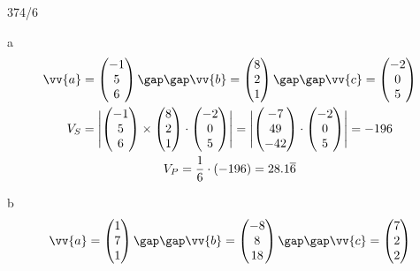 \begin{exercise}{374/6}
  \item [a]
  \begin{gather*}
    \vv{a} = \begin{pmatrix}-1 \\ 5 \\ 6\end{pmatrix} \gap\gap \vv{b} = \begin{pmatrix}8 \\ 2 \\ 1\end{pmatrix} \gap\gap \vv{c} = \begin{pmatrix}-2 \\ 0 \\ 5\end{pmatrix} \\
    V_S = \Biggl|\begin{pmatrix}-1 \\ 5 \\ 6\end{pmatrix} \times \begin{pmatrix}8 \\ 2 \\ 1\end{pmatrix} \cdot \begin{pmatrix}-2 \\ 0 \\ 5\end{pmatrix}\Biggr| = \Biggl|\begin{pmatrix}-7 \\ 49 \\ -42\end{pmatrix} \cdot \begin{pmatrix}-2 \\ 0 \\ 5\end{pmatrix}\Biggr| = -196 \\
    V_P = \frac{1}{6} \cdot (-196) = 28.1\overline{6}
  \end{gather*}
  \item [b]
  \begin{gather*}
    \vv{a} = \begin{pmatrix}1 \\ 7 \\ 1\end{pmatrix} \gap\gap \vv{b} = \begin{pmatrix}-8 \\ 8 \\ 18\end{pmatrix} \gap\gap \vv{c} = \begin{pmatrix}7 \\ 2 \\ 2\end{pmatrix} \\

\end{gather*}
\end{exercise}
